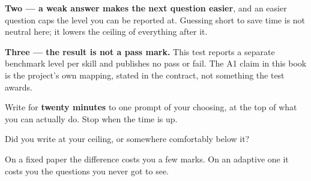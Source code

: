 \textbf{Two — a weak answer makes the next question easier}, and an easier question caps the level you can be reported at. Guessing short to save time is not neutral here; it lowers the ceiling of everything after it.

\textbf{Three — the result is not a pass mark.} This test reports a separate benchmark level per skill and publishes no pass or fail. The A1 claim in this book is the project's own mapping, stated in the contract, not something the test awards.

Write for \textbf{twenty minutes} to one prompt of your choosing, at the top of what you can actually do. Stop when the time is up.

\begin{tcolorbox}[breakable,colback=teal!4,colframe=teal!35!black,title={Before you move on}]
Did you write at your ceiling, or somewhere comfortably below it?

On a fixed paper the difference costs you a few marks. On an adaptive one it costs you the questions you never got to see.
\end{tcolorbox}
